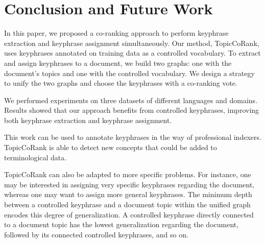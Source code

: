 \section{Conclusion and Future Work}
\label{sec:conclusion}
  In this paper, we proposed a co-ranking approach to perform keyphrase
  extraction and keyphrase assignment simultaneously. Our method,
  TopicCoRank, uses keyphrases annotated on training data as a controlled
  vocabulary. %
  To extract and assign keyphrases to a document, we build two graphs: one with the
  document's topics and one with the controlled vocabulary. We design a strategy to unify the two graphs and 
  choose the keyphrases with  a co-ranking vote.
  
  
  We performed experiments on three datasets of different languages and
  domains. Results showed that our approach benefits from controlled
  keyphrases, improving both keyphrase extraction and keyphrase assignment.

  This work can be used to annotate keyphrases in the way of professional
  indexers. TopicCoRank is able to detect new concepts that could be added
  to terminological data.
  
  TopicCoRank can also be adapted to more specific problems. For instance,
  one may be interested in assigning very specific keyphrases regarding the
  document, whereas one may want to assign more general keyphrases. The
  minimum depth between a controlled keyphrase and a document topic within the unified graph encodes this
  degree of generalization. A controlled keyphrase directly connected to a
  document topic has the lowest generalization regarding the document,
  followed by its connected controlled keyphrases, and so on.
